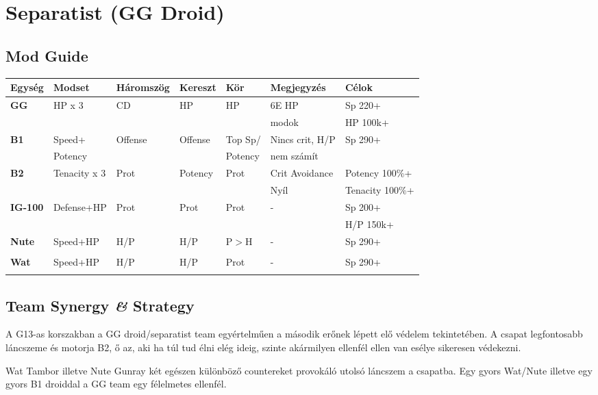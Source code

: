 \documentclass[11pt]{report}
\begin{document}

\chapter{Separatist (GG Droid)}
\section{Mod Guide}
\begin{center}
    \begin{tabular}{|l | l | l | l | l | l | l |}
        \hline
        Egység & Modset & Háromszög & Kereszt & Kör & Megjegyzés & Célok\\ \hline
        \textbf{GG} & HP x 3 & CD & HP & HP & 6E HP & Sp 220+\\
        &  &  &  &  & modok & HP 100k+\\ \hline
        \textbf{B1} & Speed+ & Offense & Offense & Top Sp/ & Nincs crit, H/P & Sp 290+\\
        & Potency &  &  & Potency & nem számít & \\ \hline
        \textbf{B2} & Tenacity x 3 & Prot & Potency & Prot & Crit Avoidance & Potency 100\%+\\
        &  &  &  &  & Nyíl & Tenacity 100\%+\\ \hline
        \textbf{IG-100} & Defense+HP & Prot & Prot & Prot & - & Sp 200+\\
        &  &  &  &  &  & H/P 150k+\\ \hline
        \textbf{Nute} & Speed+HP & H/P & H/P & P$>$H & - & Sp 290+\\
        &  &  &  &  &  & \\ \hline
        \textbf{Wat} & Speed+HP & H/P & H/P & Prot & - & Sp 290+\\
        &  &  &  &  &  & \\ \hline        
    \end{tabular}
\end{center}
\section{Team Synergy \textit{\&} Strategy}
A G13-as korszakban a GG droid/separatist team egyértelműen a második erőnek lépett elő védelem tekintetében. A csapat legfontosabb láncszeme és motorja B2, ő az, aki ha túl tud élni elég ideig, szinte akármilyen ellenfél ellen van esélye sikeresen védekezni.\par
Wat Tambor illetve Nute Gunray két egészen különböző countereket provokáló utolsó láncszem a csapatba. Egy gyors Wat/Nute illetve egy gyors B1 droiddal a GG team egy félelmetes ellenfél.
\end{document}
